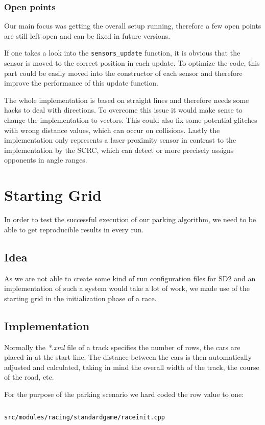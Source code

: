 \documentclass[paper=a4, fontsize=11pt]{scrreprt}
\begin{document}
\subsubsection{Open points}
Our main focus was getting the overall setup running,
therefore a few open points are still left open
and can be fixed in future versions.

If one takes a look into the \texttt{sensors\_update} function,
it is obvious that the sensor is moved to the correct position in each update.
To optimize the code, this part could be easily moved into the constructor of each sensor
and therefore improve the performance of this update function.

The whole implementation is based on straight lines
and therefore needs some hacks to deal with directions.
To overcome this issue it would make sense to change the implementation to vectors.
This could also fix some potential glitches with wrong distance values,
which can occur on collisions.
Lastly the implementation only represents a laser proximity sensor
in contrast to the implementation by the SCRC,
which can detect or more precisely assigns opponents in angle ranges.

\section{Starting Grid}
In order to test the successful execution of our parking algorithm,
we need to be able to get reproducible results in every run.

\subsection{Idea}
As we are not able to create some kind of run configuration files for SD2
and an implementation of such a system would take a lot of work,
we made use of the starting grid in the initialization phase of a race.

\subsection{Implementation}
Normally the \textit{*.xml} file of a track specifies the number of rows,
the cars are placed in at the start line.
The distance between the cars is then automatically adjusted and calculated,
taking in mind the overall width of the track, the course of the road, etc.

For the purpose of the parking scenario we hard coded the row value to one:
\begin{listing}[ht]
  \inputminted[firstline=309,linenos=true,lastline=311,gobble=1]{c++}{../../../simulators/speed-dreams/src/modules/racing/standardgame/raceinit.cpp}
  \caption{\texttt{src/modules/racing/standardgame/raceinit.cpp}}
\end{listing}
\end{document}
